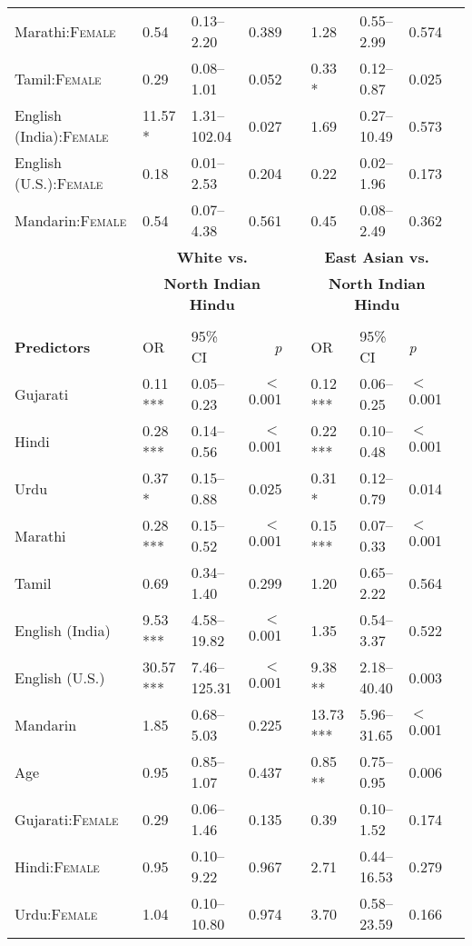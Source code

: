 \begin{table}[ht]
\begin{threeparttable}
\begin{tabular}{lllrllllr}
 Marathi:\textsc{Female}  & 0.54 & 0.13--2.20 & 0.389 &  & 1.28 & 0.55--2.99 & 0.574 \\ 
 Tamil:\textsc{Female}  & 0.29 & 0.08--1.01 & 0.052 &  & 0.33 * & 0.12--0.87 & 0.025 \\ 
 English (India):\textsc{Female}  & 11.57 * & 1.31--102.04 & 0.027 &  & 1.69 & 0.27--10.49 & 0.573 \\ 
 English (U.S.):\textsc{Female}  & 0.18 & 0.01--2.53 & 0.204 &  & 0.22 & 0.02--1.96 & 0.173 \\ 
 Mandarin:\textsc{Female}  & 0.54 & 0.07--4.38 & 0.561 &  & 0.45 & 0.08--2.49 & 0.362 \\ 
\midrule
& 
\multicolumn{3}{c}{\textbf{White vs.}} & &
\multicolumn{3}{c}{\textbf{East Asian vs.}}\\

& \multicolumn{3}{c}{\textbf{North Indian Hindu}\tnote{a}} & & \multicolumn{3}{c}{\textbf{North Indian Hindu}\tnote{a}} \\
\cline{2-4} \cline{6-8} \\[-.75em]
\textbf{Predictors} & OR & 95\% CI & \textit{p} & & OR & 95\% CI & \textit{p} \\ 
\midrule
 Gujarati & 0.11 *** & 0.05--0.23 & $<$0.001 &  & 0.12 *** & 0.06--0.25 & $<$0.001 \\ 
 Hindi & 0.28 *** & 0.14--0.56 & $<$0.001 &  & 0.22 *** & 0.10--0.48 & $<$0.001 \\ 
 Urdu & 0.37 * & 0.15--0.88 & 0.025 &  & 0.31 * & 0.12--0.79 & 0.014 \\ 
 Marathi & 0.28 *** & 0.15--0.52 & $<$0.001 &  & 0.15 *** & 0.07--0.33 & $<$0.001 \\ 
 Tamil & 0.69 & 0.34--1.40 & 0.299 &  & 1.20 & 0.65--2.22 & 0.564 \\ 
 English (India) & 9.53 *** & 4.58--19.82 & $<$0.001 &  & 1.35 & 0.54--3.37 & 0.522 \\ 
 English (U.S.) & 30.57 *** & 7.46--125.31 & $<$0.001 &  & 9.38 ** & 2.18--40.40 & 0.003 \\ 
 Mandarin & 1.85 & 0.68--5.03 & 0.225 &  & 13.73 *** & 5.96--31.65 & $<$0.001 \\ 
 Age\tnote{b} & 0.95 & 0.85--1.07 & 0.437 &  & 0.85 ** & 0.75--0.95 & 0.006 \\ 
 Gujarati:\textsc{Female}  & 0.29 & 0.06--1.46 & 0.135 &  & 0.39 & 0.10--1.52 & 0.174 \\ 
 Hindi:\textsc{Female}  & 0.95 & 0.10--9.22 & 0.967 &  & 2.71 & 0.44--16.53 & 0.279 \\ 
 Urdu:\textsc{Female}  & 1.04 & 0.10--10.80 & 0.974 &  & 3.70 & 0.58--23.59 & 0.166 \\ 

\end{tabular}
\end{threeparttable}
\end{table}
